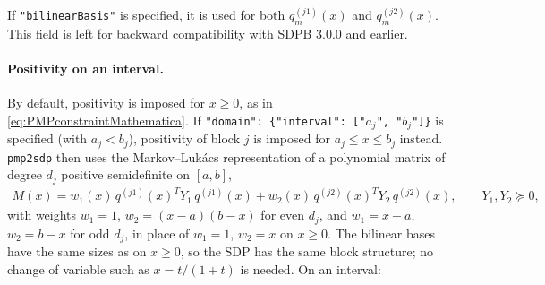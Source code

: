 \documentclass[12pt]{article}
\numberwithin{equation}{section}
\renewcommand{\be}{\begin{eqnarray}}
\renewcommand{\ee}{\end{eqnarray}}
\begin{document}
If \texttt{"bilinearBasis"} is specified, it is used for both $q_m^{(j1)}(x)$ and $q_m^{(j2)}(x)$. This field is left for backward compatibility with SDPB 3.0.0 and earlier.

\paragraph{Positivity on an interval.}
By default, positivity is imposed for $x\geq 0$, as in \eqref{eq:PMPconstraintMathematica}.
If \texttt{"domain": \{"interval": ["$a_j$", "$b_j$"]\}} is specified (with $a_j<b_j$), positivity of block $j$ is imposed for $a_j\leq x\leq b_j$ instead.
\texttt{pmp2sdp} then uses the Markov--Luk\'acs representation of a polynomial matrix of degree $d_j$ positive semidefinite on $[a,b]$,
\be
M(x) = w_1(x)\, q^{(j1)}(x)^T Y_1\, q^{(j1)}(x) + w_2(x)\, q^{(j2)}(x)^T Y_2\, q^{(j2)}(x),\qquad Y_1,Y_2\succeq 0,
\ee
with weights $w_1=1$, $w_2=(x-a)(b-x)$ for even $d_j$, and $w_1=x-a$, $w_2=b-x$ for odd $d_j$, in place of $w_1=1$, $w_2=x$ on $x\geq 0$.
The bilinear bases have the same sizes as on $x\geq 0$, so the SDP has the same block structure; no change of variable such as $x=t/(1+t)$ is needed.
On an interval:
\end{document}
